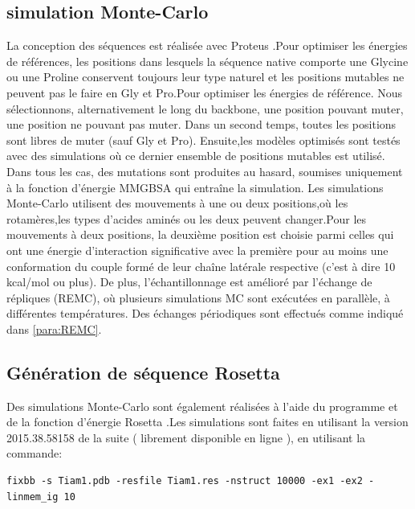 \subsection{simulation Monte-Carlo}    

La conception des séquences est réalisée avec Proteus \cite{Simonson13b}.Pour optimiser les énergies de références, les positions dans lesquels la séquence native comporte une Glycine ou une Proline conservent toujours leur type naturel et les positions mutables ne peuvent pas le faire en Gly et Pro.Pour optimiser les énergies de référence. Nous sélectionnons, alternativement le long du backbone, une position pouvant muter, une position ne pouvant pas muter. Dans un second temps, toutes les positions sont libres de muter (sauf Gly et Pro).
Ensuite,les modèles optimisés sont testés avec des simulations où ce dernier ensemble de positions mutables est utilisé.
Dans tous les cas, des mutations sont produites au hasard, soumises uniquement à la fonction d'énergie MMGBSA qui entraîne la simulation. Les simulations Monte-Carlo utilisent des mouvements à une ou deux positions,où les rotamères,les types d'acides aminés ou les deux peuvent changer.Pour les mouvements à deux positions, la deuxième position est choisie parmi celles qui ont une énergie d'interaction significative avec la première pour au moins une conformation du couple formé de leur chaîne latérale respective (c'est à dire 10 kcal/mol ou plus). De plus, l'échantillonnage est amélioré par l'échange de répliques (REMC), où plusieurs simulations MC sont exécutées en parallèle, à différentes températures. Des échanges périodiques sont effectués comme indiqué dans \ref{para:REMC}.


\subsection{Génération de séquence Rosetta}

Des simulations Monte-Carlo sont également réalisées à l'aide du programme et de la fonction d'énergie Rosetta \cite{Baker06b}.Les simulations sont faites en utilisant la version 2015.38.58158 de la suite ( librement disponible en ligne ), en utilisant la commande:

\begin{verbatim}
fixbb -s Tiam1.pdb -resfile Tiam1.res -nstruct 10000 -ex1 -ex2 -linmem_ig 10
\end{verbatim} \normalsize



